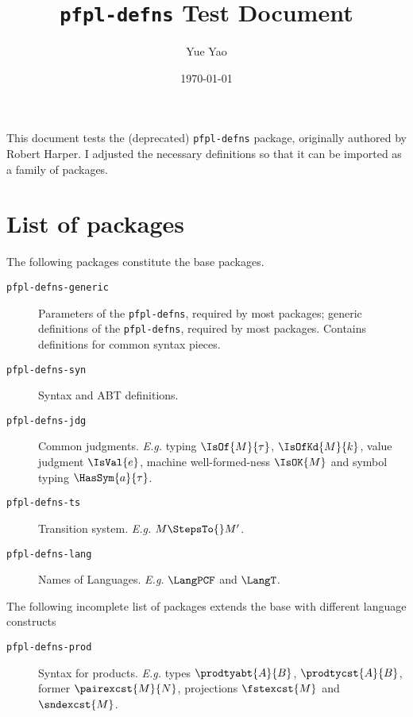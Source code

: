 \documentclass[10pt]{article}
\title{\texttt{pfpl-defns} Test Document}%
\author{Yue Yao}
\date{\today}
\begin{document}
\maketitle{}

This document tests the (deprecated) \texttt{pfpl-defns} package, originally authored by Robert Harper. 
I adjusted the necessary definitions so that it can be imported as a family of packages. 

\section{List of packages}

The following packages constitute the base packages.

\begin{description}
    \item[\texttt{pfpl-defns-generic}] 
    Parameters of the \texttt{pfpl-defns}, required by most packages;
    generic definitions of the \texttt{pfpl-defns}, 
    required by most packages. Contains definitions for common syntax pieces. 

    \item[\texttt{pfpl-defns-syn}] Syntax and ABT definitions.

    \item[\texttt{pfpl-defns-jdg}] Common judgments. \emph{E.g.} typing $\IsOf{M}{\tau}$, $\IsOfKd{M}{k}$, 
    value judgment $\IsVal{e}$, machine well-formed-ness $\IsOK{M}$ and symbol typing $\HasSym{a}{\tau}$.
    
    \item[\texttt{pfpl-defns-ts}] Transition system. \emph{E.g.} $M \StepsTo{} M'$.

    \item[\texttt{pfpl-defns-lang}] Names of Languages. \emph{E.g.} $\LangPCF$ and $\LangT$.
\end{description}
    
The following incomplete list of packages extends the base with different language constructs


\begin{description}
    \item[\texttt{pfpl-defns-prod}] Syntax for products. \emph{E.g.} types $\prodtyabt{A}{B}$, $\prodtycst{A}{B}$, 
    former $\pairexcst{M}{N}$, projections $\fstexcst{M}$ and $\sndexcst{M}$.
\end{description}
\end{document}
